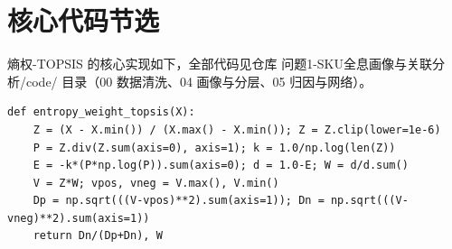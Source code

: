 \documentclass[zihao=-4,a4paper]{ctexart}
\begin{document}
\section{核心代码节选}

熵权-TOPSIS 的核心实现如下，全部代码见仓库 问题1-SKU全息画像与关联分析/code/ 目录（00 数据清洗、04 画像与分层、05 归因与网络）。

\begin{verbatim}
def entropy_weight_topsis(X):
    Z = (X - X.min()) / (X.max() - X.min()); Z = Z.clip(lower=1e-6)
    P = Z.div(Z.sum(axis=0), axis=1); k = 1.0/np.log(len(Z))
    E = -k*(P*np.log(P)).sum(axis=0); d = 1.0-E; W = d/d.sum()
    V = Z*W; vpos, vneg = V.max(), V.min()
    Dp = np.sqrt(((V-vpos)**2).sum(axis=1)); Dn = np.sqrt(((V-vneg)**2).sum(axis=1))
    return Dn/(Dp+Dn), W
\end{verbatim}

% 
% 
\end{document}
